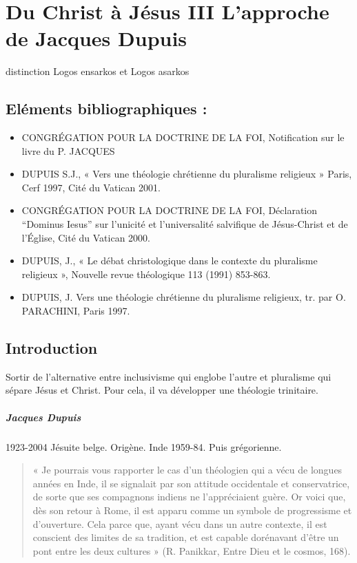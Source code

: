 \chapter{Du Christ à Jésus III
L’approche de Jacques Dupuis}{distinction Logos ensarkos et Logos asarkos}


\section{Eléments bibliographiques :}
\begin{itemize}
    \item CONGRÉGATION POUR LA DOCTRINE DE LA FOI, Notification sur le livre du P. JACQUES
   \item DUPUIS S.J., « Vers une théologie chrétienne du pluralisme religieux » Paris, Cerf 1997,
Cité du Vatican 2001.
   \item CONGRÉGATION POUR LA DOCTRINE DE LA FOI, Déclaration “Dominus Iesus” sur l’unicité
et l’universalité salvifique de Jésus-Christ et de l’Église, Cité du Vatican 2000.
   \item DUPUIS, J., « Le débat christologique dans le contexte du pluralisme religieux », Nouvelle
revue théologique 113 (1991) 853-863.
   \item DUPUIS, J. Vers une théologie chrétienne du pluralisme religieux, tr. par O. PARACHINI, Paris
1997.
\end{itemize}


\section{Introduction}

\begin{Prop}
Sortir de l'alternative entre inclusivisme qui englobe l'autre et pluralisme qui sépare Jésus et Christ.
Pour cela, il va développer une théologie trinitaire. 
\end{Prop}



\paragraph{Jacques Dupuis} 1923-2004 Jésuite belge. Origène. Inde 1959-84. Puis grégorienne.

\begin{quote}
    « Je pourrais vous rapporter le cas d’un théologien qui a vécu de longues années en Inde, il se signalait
par son attitude occidentale et conservatrice, de sorte que ses compagnons indiens ne l’appréciaient
guère. Or voici que, dès son retour à Rome, il est apparu comme un symbole de progressisme et
d’ouverture. Cela parce que, ayant vécu dans un autre contexte, il est conscient des limites de sa
tradition, et est capable dorénavant d’être un pont entre les deux cultures » (R. Panikkar, Entre Dieu et
le cosmos, 168).
\end{quote}

